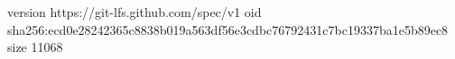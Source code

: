 version https://git-lfs.github.com/spec/v1
oid sha256:ecd0e28242365c8838b019a563df56e3cdbc76792431c7bc19337ba1e5b89ec8
size 11068
